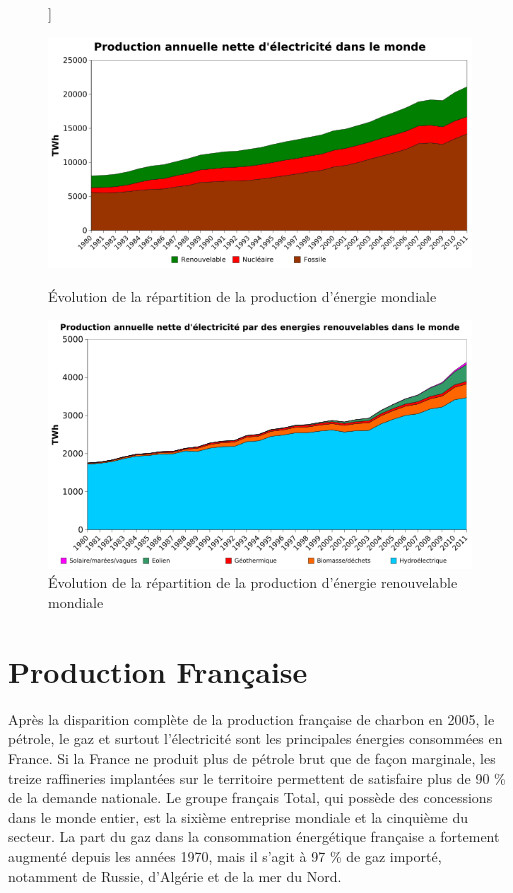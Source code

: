 \documentclass[12pt,a4paper,oneside,openany]{memoir}
\begin{document}
\begin{figure}[h]
	\centering]\hspace*{-5mm}
	\begin{minipage}{.5\textwidth}
		\centering
		\includegraphics[width=\linewidth]{img/monde1.png}
		\caption{Évolution de la répartition de la production d'énergie mondiale}
		\label{fig:monde1}
	\end{minipage}%
	\hspace*{1cm}
	\begin{minipage}{.5\textwidth}
		\centering
		\includegraphics[width=\linewidth]{img/monde2.png}
		\caption{Évolution de la répartition de la production d'énergie renouvelable mondiale}
		\label{fig:monde2}
	\end{minipage}
\end{figure}



\section{Production Française}

Après la disparition complète de la production française de charbon en 2005, le pétrole, le gaz et surtout l’électricité sont les principales énergies consommées en France. Si la France ne produit plus de pétrole brut que de façon marginale, les treize raffineries implantées sur le territoire permettent de satisfaire plus de 90 \% de la demande nationale. Le groupe français Total, qui possède des concessions dans le monde entier, est la sixième entreprise mondiale et la cinquième du secteur. La part du gaz dans la consommation énergétique française a fortement augmenté depuis les années 1970, mais il s’agit à 97 \% de gaz importé, notamment de Russie, d’Algérie et de la mer du Nord. 
\end{document}
